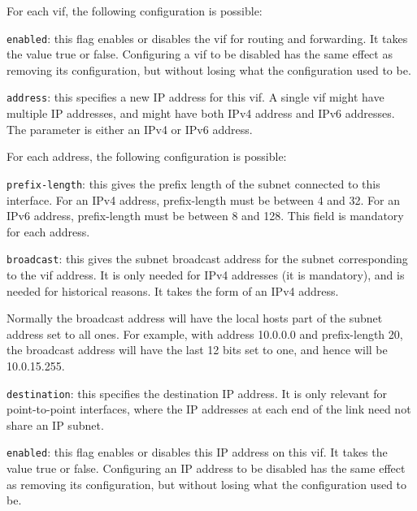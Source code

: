 \begin{description}
\begin{description}
  For each vif, the following configuration is possible:
\begin{description}
\item{\tt enabled}: this flag enables or disables the vif for
  routing and forwarding.  It takes the value {\stt true} or {\stt
  false}.  Configuring a vif to be disabled has the same effect
  as removing its configuration, but without losing what the
  configuration used to be.
\item{\tt address}: this specifies a new IP address for this vif.  A
  single vif might have multiple IP addresses, and might have both IPv4
  address and IPv6 addresses.  The parameter is either an IPv4 or IPv6
  address.

  For each address, the following configuration is possible:
\begin{description}
\item{\tt prefix-length}: this gives the prefix length of the subnet
  connected to this interface.  For an IPv4 address, prefix-length
  must be between 4 and 32.  For an IPv6 address, prefix-length must
  be between 8 and 128.  This field is mandatory for each address.
\item{\tt broadcast}: this gives the subnet broadcast address for the
  subnet corresponding to the vif address.  It is only needed for IPv4
  addresses (it is mandatory), and is needed for historical reasons.
  It takes the form of an IPv4 address.

  Normally the broadcast address will have the local hosts part of the
  subnet address set to all ones.  For example, with address 10.0.0.0
  and prefix-length 20, the broadcast address will have the last 12
  bits set to one, and hence will be 10.0.15.255.
\item{\tt destination}: this specifies the destination IP address.  It
  is only relevant for point-to-point interfaces, where the IP addresses
  at each end of the link need not share an IP subnet.
\item{\tt enabled}: this flag enables or disables this IP address on
  this vif.  It takes the value {\stt true} or {\stt false}.
  Configuring an IP address to be disabled has the same effect as removing its
  configuration, but without losing what the configuration used to be.
\end{description}
\end{description}
\end{description}
\end{description}

\newpage
